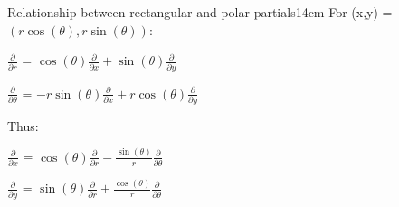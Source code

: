     \begin{wtheorem}{Relationship between rectangular and polar partials}{14cm}
        For (x,y) = $(r\cos(\theta),r\sin(\theta))$:
        
        \hspace{0.5cm}
        $\frac{\partial}{\partial r}$
        = $\cos(\theta) \frac{\partial}{\partial x}
            + \sin(\theta) \frac{\partial}{\partial y}$

        \hspace{0.5cm}
        $\frac{\partial}{\partial \theta}$
        = $-r \sin(\theta) \frac{\partial}{\partial x}
            + r \cos(\theta) \frac{\partial}{\partial y}$

        Thus:

        \hspace{0.5cm}
        $\frac{\partial}{\partial x}$
        = $\cos(\theta) \frac{\partial}{\partial r}
            - \frac{\sin(\theta)}{r} \frac{\partial}{\partial \theta}$

        \hspace{0.5cm}
        $\frac{\partial}{\partial y}$
        = $\sin(\theta) \frac{\partial}{\partial r}
            + \frac{\cos(\theta)}{r} \frac{\partial}{\partial \theta}$
    \end{wtheorem}

